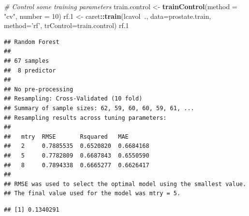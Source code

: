 \documentclass[]{book}
\newenvironment{Shaded}{\begin{snugshade}}{\end{snugshade}}
\newcommand{\CommentTok}[1]{\textcolor[rgb]{0.56,0.35,0.01}{\textit{#1}}}
\newcommand{\DataTypeTok}[1]{\textcolor[rgb]{0.13,0.29,0.53}{#1}}
\newcommand{\DecValTok}[1]{\textcolor[rgb]{0.00,0.00,0.81}{#1}}
\newcommand{\FloatTok}[1]{\textcolor[rgb]{0.00,0.00,0.81}{#1}}
\newcommand{\KeywordTok}[1]{\textcolor[rgb]{0.13,0.29,0.53}{\textbf{#1}}}
\newcommand{\NormalTok}[1]{#1}
\newcommand{\OperatorTok}[1]{\textcolor[rgb]{0.81,0.36,0.00}{\textbf{#1}}}
\newcommand{\StringTok}[1]{\textcolor[rgb]{0.31,0.60,0.02}{#1}}
\theoremstyle{definition}
\theoremstyle{definition}
\theoremstyle{definition}
\theoremstyle{remark}
\begin{document}
\begin{Shaded}
\begin{Highlighting}[]
\CommentTok{# Control some training parameters}
\NormalTok{train.control <-}\StringTok{ }\KeywordTok{trainControl}\NormalTok{(}\DataTypeTok{method =} \StringTok{"cv"}\NormalTok{, }\DataTypeTok{number =} \DecValTok{10}\NormalTok{)}
\NormalTok{rf}\FloatTok{.1}\NormalTok{ <-}\StringTok{ }\NormalTok{caret}\OperatorTok{::}\KeywordTok{train}\NormalTok{(lcavol}\OperatorTok{~}\NormalTok{., }\DataTypeTok{data=}\NormalTok{prostate.train, }
                \DataTypeTok{method=}\StringTok{'rf'}\NormalTok{, }
                \DataTypeTok{trControl=}\NormalTok{train.control)}
\NormalTok{rf}\FloatTok{.1}
\end{Highlighting}
\end{Shaded}

\begin{verbatim}
## Random Forest 
## 
## 67 samples
##  8 predictor
## 
## No pre-processing
## Resampling: Cross-Validated (10 fold) 
## Summary of sample sizes: 62, 59, 60, 60, 59, 61, ... 
## Resampling results across tuning parameters:
## 
##   mtry  RMSE       Rsquared   MAE      
##   2     0.7885535  0.6520820  0.6684168
##   5     0.7782809  0.6687843  0.6550590
##   8     0.7894338  0.6665277  0.6626417
## 
## RMSE was used to select the optimal model using the smallest value.
## The final value used for the model was mtry = 5.
\end{verbatim}

\begin{Shaded}
\end{Shaded}

\begin{verbatim}
## [1] 0.1340291
\end{verbatim}

\begin{Shaded}
\end{Shaded}
\end{document}
